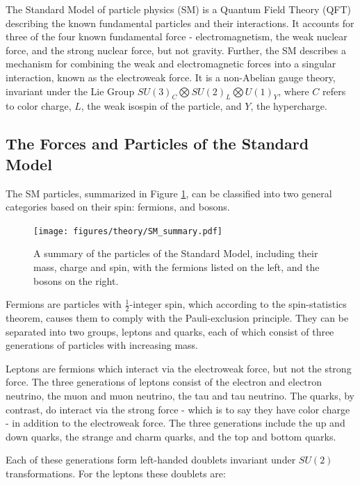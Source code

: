 
The Standard Model of particle physics (SM) is a Quantum Field Theory (QFT) describing the known fundamental particles and their interactions. It accounts for three of the four known fundamental force - electromagnetism, the weak nuclear force, and the strong nuclear force, but not gravity. Further, the SM describes a mechanism for combining the weak and electromagnetic forces into a singular interaction, known as the electroweak force. It is a non-Abelian gauge theory, invariant under the Lie Group $SU(3)_C\bigotimes SU(2)_L\bigotimes U(1)_Y$, where $C$ refers to color charge, $L$, the weak isospin of the particle, and $Y$, the hypercharge.

\subsection{The Forces and Particles of the Standard Model}
\label{sec:forcesParticles}

The SM particles, summarized in Figure \ref{fig:SM_summary}, can be classified into two general categories based on their spin: fermions, and bosons. 

\begin{figure}[H]
\centering
   \texttt{[image: figures/theory/SM\_summary.pdf]}
\caption{A summary of the particles of the Standard Model, including their mass, charge and spin, with the fermions listed on the left, and the bosons on the right. \cite{oerter2006the}}
\label{fig:SM_summary}
\end{figure}

Fermions are particles with $\frac{1}{2}$-integer spin, which according to the spin-statistics theorem, causes them to comply with the Pauli-exclusion principle. They can be separated into two groups, leptons and quarks, each of which consist of three generations of particles with increasing mass.

Leptons are fermions which interact via the electroweak force, but not the strong force. The three generations of leptons consist of the electron and electron neutrino, the muon and muon neutrino, the tau and tau neutrino. The quarks, by contrast, do interact via the strong force - which is to say they have color charge - in addition to the electroweak force. The three generations include the up and down quarks, the strange and charm quarks, and the top and bottom quarks. 

Each of these generations form left-handed doublets invariant under $SU(2)$ transformations. For the leptons these doublets are:

